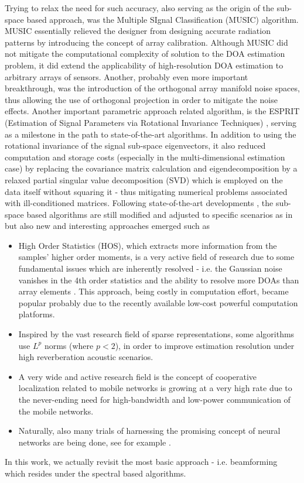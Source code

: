 Trying to relax the need for such accuracy, also serving as the origin of the sub-space based approach, was the Multiple SIgnal Classification (MUSIC) \cite{schmidt1986multiple} algorithm.
MUSIC essentially relieved the designer from designing accurate radiation patterns by introducing the concept of array calibration.
Although MUSIC did not mitigate the computational complexity of solution to the DOA estimation problem, it did extend the applicability of high-resolution DOA estimation to arbitrary arrays of sensors.
Another, probably even more important breakthrough, was the introduction of the orthogonal array manifold noise spaces, thus allowing the use of orthogonal projection in order to mitigate the noise effects.
Another important parametric approach related algorithm, is the ESPRIT (Estimation of Signal Parameters via Rotational Invariance Techniques) \cite{ESPRIT}, serving as a milestone in the path to state-of-the-art algorithms.
In addition to using the rotational invariance of the signal sub-space eigenvectors, it also reduced computation and storage costs (especially in the multi-dimensional estimation case) by replacing the covariance matrix calculation and eigendecomposition by a relaxed partial singular value decomposition (SVD) which is employed on the data itself without squaring it - thus mitigating numerical problems associated with ill-conditioned matrices.
Following state-of-the-art developments \cite{tuncer2009classical}, the sub-space based algorithms are still modified and adjusted to specific scenarios as in \cite{LpNorm_MUSIC} but also new and interesting approaches emerged such as
\begin{itemize}
    \item High Order Statistics (HOS), which extracts more information from the samples' higher order moments, is a very active field of research due to some fundamental issues which are inherently resolved - i.e. the Gaussian noise vanishes in the 4th order statistics and the ability to resolve more DOAs than array elements \cite{chevalier2006high}.
    This approach, being costly in computation effort, became popular probably due to the recently available low-cost powerful computation platforms.
    \item Inspired by the vast research field of sparse representations, some algorithms \cite{nadiri2014localization} use $L^{p}$ norms (where $p<2$), in order to improve estimation resolution under high reverberation acoustic scenarios.
    \item A very wide and active research field is the concept of cooperative localization related to mobile networks is growing at a very high rate due to the never-ending need for high-bandwidth and low-power communication of the mobile networks.
    \item Naturally, also many trials of harnessing the promising concept of neural networks are being done, see for example \cite{shareef2008localization}.
\end{itemize}
In this work, we actually revisit the most basic approach - i.e. beamforming which resides under the spectral based algorithms.